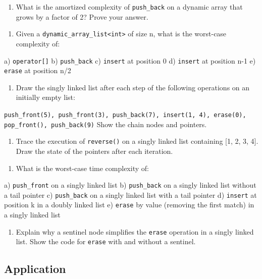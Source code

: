 \begin{enumerate}
\item What is the amortized complexity of \texttt{push\_back} on a dynamic array that grows by a factor of 2? Prove your answer.
\end{enumerate}

\begin{enumerate}
\item Given a \texttt{dynamic\_array\_list<int>} of size n, what is the worst-case complexity of:
\end{enumerate}
   a) \texttt{operator[]}   b) \texttt{push\_back}   c) \texttt{insert} at position 0   d) \texttt{insert} at position n-1   e) \texttt{erase} at position n/2

\begin{enumerate}
\item Draw the singly linked list after each step of the following operations on an initially empty list:
\end{enumerate}
   \texttt{push\_front(5), push\_front(3), push\_back(7), insert(1, 4), erase(0), pop\_front(), push\_back(9)}
   Show the chain nodes and pointers.

\begin{enumerate}
\item Trace the execution of \texttt{reverse()} on a singly linked list containing [1, 2, 3, 4]. Draw the state of the pointers after each iteration.
\end{enumerate}

\begin{enumerate}
\item What is the worst-case time complexity of:
\end{enumerate}
   a) \texttt{push\_front} on a singly linked list
   b) \texttt{push\_back} on a singly linked list without a tail pointer
   c) \texttt{push\_back} on a singly linked list with a tail pointer
   d) \texttt{insert} at position k in a doubly linked list
   e) \texttt{erase} by value (removing the first match) in a singly linked list

\begin{enumerate}
\item Explain why a sentinel node simplifies the \texttt{erase} operation in a singly linked list. Show the code for \texttt{erase} with and without a sentinel.
\end{enumerate}

\subsection{Application}

